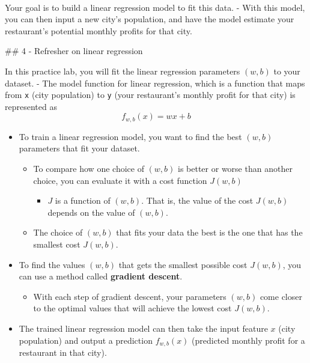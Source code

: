 \documentclass[11pt]{article}
\providecommand{\tightlist}{%
      \setlength{\itemsep}{0pt}\setlength{\parskip}{0pt}}
\begin{document}
    \begin{center}
    \end{center}
    { \hspace*{\fill} \\}
    
    Your goal is to build a linear regression model to fit this data. - With
this model, you can then input a new city's population, and have the
model estimate your restaurant's potential monthly profits for that
city.

    \#\# 4 - Refresher on linear regression

In this practice lab, you will fit the linear regression parameters
\((w,b)\) to your dataset. - The model function for linear regression,
which is a function that maps from \texttt{x} (city population) to
\texttt{y} (your restaurant's monthly profit for that city) is
represented as \[f_{w,b}(x) = wx + b\]

\begin{itemize}
\item
  To train a linear regression model, you want to find the best
  \((w,b)\) parameters that fit your dataset.

  \begin{itemize}
  \tightlist
  \item
    To compare how one choice of \((w,b)\) is better or worse than
    another choice, you can evaluate it with a cost function \(J(w,b)\)

    \begin{itemize}
    \tightlist
    \item
      \(J\) is a function of \((w,b)\). That is, the value of the cost
      \(J(w,b)\) depends on the value of \((w,b)\).
    \end{itemize}
  \item
    The choice of \((w,b)\) that fits your data the best is the one that
    has the smallest cost \(J(w,b)\).
  \end{itemize}
\item
  To find the values \((w,b)\) that gets the smallest possible cost
  \(J(w,b)\), you can use a method called \textbf{gradient descent}.

  \begin{itemize}
  \tightlist
  \item
    With each step of gradient descent, your parameters \((w,b)\) come
    closer to the optimal values that will achieve the lowest cost
    \(J(w,b)\).
  \end{itemize}
\item
  The trained linear regression model can then take the input feature
  \(x\) (city population) and output a prediction \(f_{w,b}(x)\)
  (predicted monthly profit for a restaurant in that city).
\end{itemize}
\end{document}
